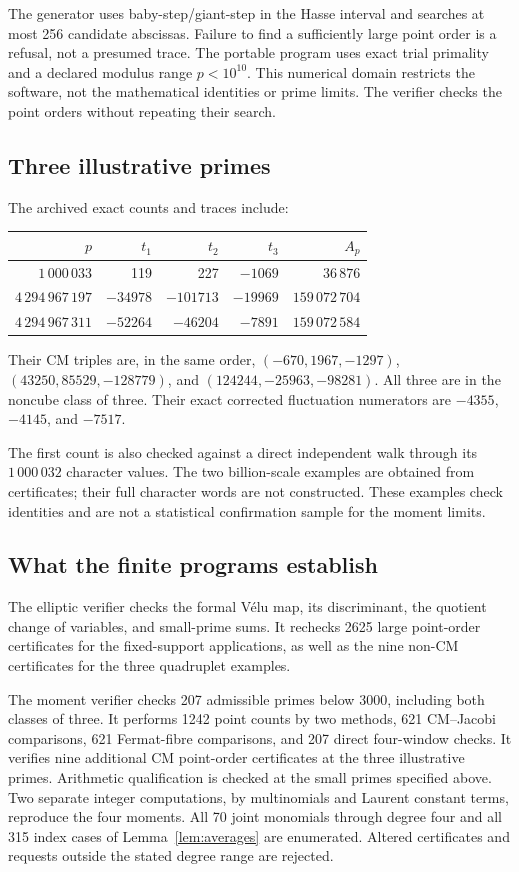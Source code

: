 \documentclass[11pt]{article}
\theoremstyle{definition}\newtheorem{definition}[theorem]{Definition}
\begin{document}
The generator uses baby-step/giant-step in the
Hasse interval and searches at most 256
candidate abscissas. Failure to find a
sufficiently large point order is a refusal,
not a presumed trace. The portable program
uses exact trial primality and a declared
modulus range $p<10^{10}$. This numerical
domain restricts the software, not the
mathematical identities or prime limits.
The verifier checks the point orders without
repeating their search.

\subsection{Three illustrative primes}
The archived exact counts and traces include:
\begin{center}
\begin{tabular}{r rrr r}
\toprule
$p$&$t_1$&$t_2$&$t_3$&$A_p$\\
\midrule
$1\,000\,033$&119&227&$-1069$&$36\,876$\\
$4\,294\,967\,197$&$-34978$&$-101713$&$-19969$&$159\,072\,704$\\
$4\,294\,967\,311$&$-52264$&$-46204$&$-7891$&$159\,072\,584$\\
\bottomrule
\end{tabular}
\end{center}
Their CM triples are, in the same order,
$(-670,1967,-1297)$,
$(43250,85529,-128779)$, and
$(124244,-25963,-98281)$.
All three are in the noncube class of three.
Their exact corrected fluctuation numerators
are $-4355$, $-4145$, and $-7517$.

The first count is also checked against a
direct independent walk through its
$1\,000\,032$ character values. The two
billion-scale examples are obtained from
certificates; their full character words
are not constructed. These examples check
identities and are not a statistical
confirmation sample for the moment limits.

\subsection{What the finite programs establish}
The elliptic verifier checks the formal
V\'elu map, its discriminant, the quotient
change of variables, and small-prime sums.
It rechecks 2625 large point-order
certificates for the fixed-support
applications, as well as the nine
non-CM certificates for the three
quadruplet examples.

The moment verifier checks 207 admissible
primes below 3000, including both classes
of three. It performs 1242 point counts by
two methods, 621 CM--Jacobi comparisons,
621 Fermat-fibre comparisons, and 207
direct four-window checks. It verifies
nine additional CM point-order
certificates at the three illustrative
primes. Arithmetic qualification is
checked at the small primes specified
above. Two separate integer computations,
by multinomials and Laurent constant
terms, reproduce the four moments.
All 70 joint monomials through degree
four and all 315 index cases of
Lemma~\ref{lem:averages} are enumerated.
Altered certificates and requests outside
the stated degree range are rejected.
\end{document}
